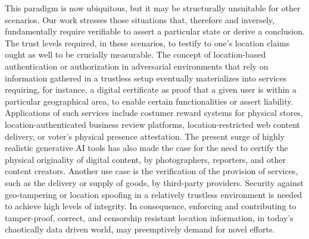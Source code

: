 This paradigm is now ubiquitous, but it may be structurally unsuitable for other scenarios. Our work stresses those situations that, therefore and inversely, fundamentally require verifiable \pol{} to assert a particular state or derive a conclusion. The trust levels required, in these scenarios, to testify to one's location claims ought as well to be crucially measurable. The concept of location-based authentication or authorization in adversarial environments that rely on information gathered in a trustless setup eventually materializes into services requiring, for instance, a digital certificate as proof that a given user is within a particular geographical area, to enable certain functionalities or assert liability. Applications of such services include costumer reward systems for physical stores, location-authenticated business review platforms, location-restricted web content delivery, or voter's physical presence attestation. The present surge of highly realistic generative AI tools has also made the case for the need to certify the physical originality of digital content, by photographers, reporters, and other content creators. Another use case is the verification of the provision of services, such as the delivery or supply of goods, by third-party providers. Security against geo-tampering or location spoofing in a relatively trustless environment is needed to achieve high levels of integrity. In consequence, enforcing and contributing to tamper-proof, correct, and censorship resistant location information, in today's chaotically data driven world, may preemptively demand for novel efforts. 

